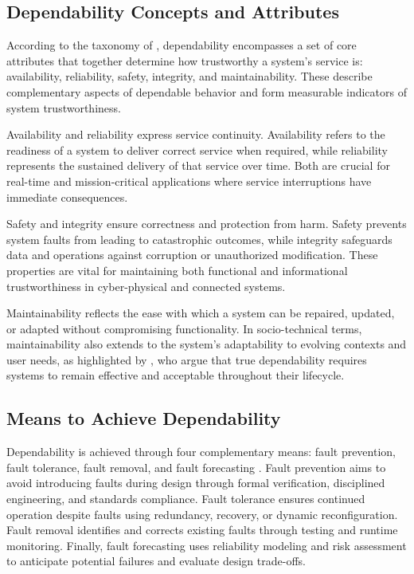 \subsection{Dependability Concepts and Attributes}\label{subsec:background-dependability-attributes}

According to the taxonomy of \citet{avizienis2004basic}, dependability encompasses a set of core attributes that together determine how trustworthy a system’s service is: availability, reliability, safety, integrity, and maintainability. These describe complementary aspects of dependable behavior and form measurable indicators of system trustworthiness.

Availability and reliability express service continuity. Availability refers to the readiness of a system to deliver correct service when required, while reliability represents the sustained delivery of that service over time. Both are crucial for real-time and mission-critical applications where service interruptions have immediate consequences.

Safety and integrity ensure correctness and protection from harm. Safety prevents system faults from leading to catastrophic outcomes, while integrity safeguards data and operations against corruption or unauthorized modification. These properties are vital for maintaining both functional and informational trustworthiness in cyber-physical and connected systems.

Maintainability reflects the ease with which a system can be repaired, updated, or adapted without compromising functionality. In socio-technical terms, maintainability also extends to the system’s adaptability to evolving contexts and user needs, as highlighted by \citet{sommerville2007dependable}, who argue that true dependability requires systems to remain effective and acceptable throughout their lifecycle.

\subsection{Means to Achieve Dependability}\label{subsec:background-dependability-means}

Dependability is achieved through four complementary means: fault prevention, fault tolerance, fault removal, and fault forecasting \citep{avizienis2004basic}.  
Fault prevention aims to avoid introducing faults during design through formal verification, disciplined engineering, and standards compliance. Fault tolerance ensures continued operation despite faults using redundancy, recovery, or dynamic reconfiguration. Fault removal identifies and corrects existing faults through testing and runtime monitoring. Finally, fault forecasting uses reliability modeling and risk assessment to anticipate potential failures and evaluate design trade-offs.

